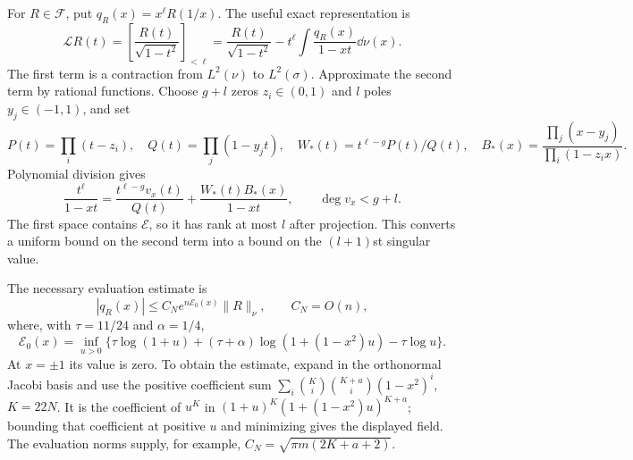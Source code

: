 For $R\in\mathcal F$,
put $q_R(x)=x^\ell R(1/x)$. The useful exact representation is
\[
 \mathcal LR(t)=\left[\frac{R(t)}{\sqrt{1-t^2}}\right]_{<\ell}
 =\frac{R(t)}{\sqrt{1-t^2}}
   -t^\ell\int\frac{q_R(x)}{1-xt}\dd\nu(x).
\]
The first term is a contraction from $L^2(\nu)$ to $L^2(\sigma)$.
Approximate the second term by rational functions. Choose $g+l$ zeros
$z_i\in(0,1)$ and $l$ poles $y_j\in(-1,1)$, and set
\[
 P(t)=\prod_i(t-z_i),\quad Q(t)=\prod_j(1-y_jt),\quad
 W_*(t)=t^{\ell-g}P(t)/Q(t),\quad
 B_*(x)=\frac{\prod_j(x-y_j)}{\prod_i(1-z_ix)}.
\]
Polynomial division gives
\[
 \frac{t^\ell}{1-xt}
 =\frac{t^{\ell-g}v_x(t)}{Q(t)}
       +\frac{W_*(t)B_*(x)}{1-xt},\qquad \deg v_x<g+l.
\]
The first space contains $\mathcal E$, so it has rank at most $l$
after projection. This converts a uniform bound on the second term
into a bound on the $(l+1)$st singular value.

The necessary evaluation estimate is
\[
 |q_R(x)|\le C_N e^{n\mathcal E_0(x)}\|R\|_\nu,
 \qquad C_N=O(n),
\]
where, with $\tau=11/24$ and $\alpha=1/4$,
\[
 \mathcal E_0(x)=\inf_{u>0}
 \{\tau\log(1+u)+(\tau+\alpha)\log(1+(1-x^2)u)-\tau\log u\}.
\]
At $x=\pm1$ its value is zero. To obtain the estimate, expand in the
orthonormal Jacobi basis and use the positive coefficient sum
$\sum_i\binom K i\binom{K+a}i(1-x^2)^i$, $K=22N$.
It is the coefficient of $u^K$ in
$(1+u)^K(1+(1-x^2)u)^{K+a}$; bounding that coefficient at positive
$u$ and minimizing gives the displayed field. The evaluation norms
supply, for example, $C_N=\sqrt{\pi m(2K+a+2)}$.

